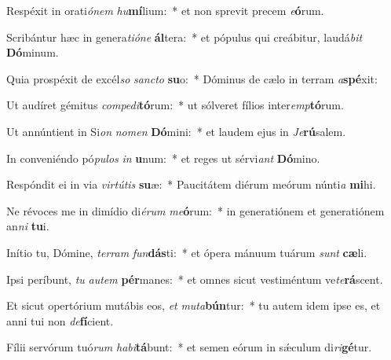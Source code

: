 \item Respéxit in orati\textit{ó}\textit{nem} \textit{hu}\textbf{mí}lium:~* et non sprevit precem \textit{e}\textbf{ó}rum.
\item Scribántur hæc in genera\textit{ti}\textit{ó}\textit{ne} \textbf{ál}tera:~* et pópulus qui creábitur, laudá\textit{bit} \textbf{Dó}minum.
\item Quia prospéxit de excél\textit{so} \textit{sanc}\textit{to} \textbf{su}o:~* Dóminus de cælo in terram \textit{a}\textbf{spé}xit:
\item Ut audíret gémitus \textit{com}\textit{pe}\textit{di}\textbf{tó}rum:~* ut sólveret fílios inter\textit{emp}\textbf{tó}rum.
\item Ut annúntient in Si\textit{on} \textit{no}\textit{men} \textbf{Dó}mini:~* et laudem ejus in \textit{Je}\textbf{rú}salem.
\item In conveniéndo pó\textit{pu}\textit{los} \textit{in} \textbf{u}num:~* et reges ut sérvi\textit{ant} \textbf{Dó}mino.
\item Respóndit ei in via \textit{vir}\textit{tú}\textit{tis} \textbf{su}æ:~* Paucitátem diérum meórum núnti\textit{a} \textbf{mi}hi.
\item Ne révoces me in dimídio di\textit{é}\textit{rum} \textit{me}\textbf{ó}rum:~* in generatiónem et generatiónem an\textit{ni} \textbf{tu}i.
\item Inítio tu, Dómine, \textit{ter}\textit{ram} \textit{fun}\textbf{dás}ti:~* et ópera mánuum tuárum \textit{sunt} \textbf{cæ}li.
\item Ipsi períbunt, \textit{tu} \textit{au}\textit{tem} \textbf{pér}manes:~* et omnes sicut vestiméntum ve\textit{te}\textbf{rá}scent.
\item Et sicut opertórium mutábis eos, \textit{et} \textit{mu}\textit{ta}\textbf{bún}tur:~* tu autem idem ipse es, et anni tui non \textit{de}\textbf{fí}cient.
\item Fílii servórum tuó\textit{rum} \textit{ha}\textit{bi}\textbf{tá}bunt:~* et semen eórum in sǽculum di\textit{ri}\textbf{gé}tur.
